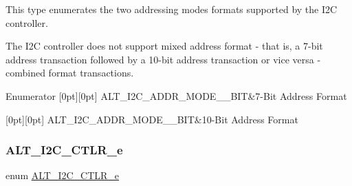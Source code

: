 This type enumerates the two addressing modes formats supported by the I2C controller.

The I2C controller does not support mixed address format -\/ that is, a 7-\/bit address transaction followed by a 10-\/bit address transaction or vice versa -\/ combined format transactions. \begin{DoxyEnumFields}{Enumerator}
[0pt][0pt]{}\mbox{\label{group__ALT__I2C_gga9f24389b4997825c99f8e6f8846be810accff0afaa6849f1f5c2bc688b78670db}} 
A\+L\+T\+\_\+\+I2\+C\+\_\+\+A\+D\+D\+R\+\_\+\+M\+O\+D\+E\+\_\+\_\+\+B\+IT&7-\/Bit Address Format \\
\hline

[0pt][0pt]{}\mbox{\label{group__ALT__I2C_gga9f24389b4997825c99f8e6f8846be810a7130f74072ffa24078e96f184689b8f5}} 
A\+L\+T\+\_\+\+I2\+C\+\_\+\+A\+D\+D\+R\+\_\+\+M\+O\+D\+E\+\_\+\_\+\+B\+IT&10-\/Bit Address Format \\
\hline

\end{DoxyEnumFields}
\mbox{\label{group__ALT__I2C_ga01201dba4856c4a6fcf418d24b5d809a}} 
\subsubsection{\texorpdfstring{ALT\_I2C\_CTLR\_e}{ALT\_I2C\_CTLR\_e}}
{\footnotesize\ttfamily enum \mbox{\hyperlink{group__ALT__I2C_ga01201dba4856c4a6fcf418d24b5d809a}{A\+L\+T\+\_\+\+I2\+C\+\_\+\+C\+T\+L\+R\+\_\+e}}}


